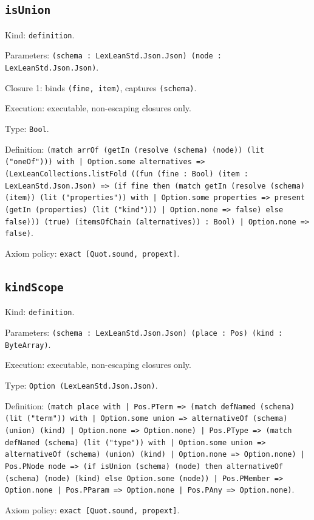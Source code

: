 \documentclass[11pt]{article}
\begin{document}
\subsection*{\texttt{isUnion}}
\noindent Kind: \texttt{definition}.\par
\noindent Parameters: \texttt{(schema : LexLeanStd.Json.Json) (node : LexLeanStd.Json.Json)}.\par
\noindent Closure 1: binds \texttt{(fine, item)}, captures \texttt{(schema)}.\par
\noindent Execution: executable, non-escaping closures only.\par
\noindent Type: \texttt{Bool}.\par
\noindent Definition: \texttt{(match arrOf (getIn (resolve (schema) (node)) (lit ("oneOf"))) with | Option.some alternatives => (LexLeanCollections.listFold ((fun (fine : Bool) (item : LexLeanStd.Json.Json) => (if fine then (match getIn (resolve (schema) (item)) (lit ("properties")) with | Option.some properties => present (getIn (properties) (lit ("kind"))) | Option.none => false) else false))) (true) (itemsOfChain (alternatives)) : Bool) | Option.none => false)}.\par
\noindent Axiom policy: \texttt{exact [Quot.sound, propext]}.\par
\subsection*{\texttt{kindScope}}
\noindent Kind: \texttt{definition}.\par
\noindent Parameters: \texttt{(schema : LexLeanStd.Json.Json) (place : Pos) (kind : ByteArray)}.\par
\noindent Execution: executable, non-escaping closures only.\par
\noindent Type: \texttt{Option (LexLeanStd.Json.Json)}.\par
\noindent Definition: \texttt{(match place with | Pos.PTerm => (match defNamed (schema) (lit ("term")) with | Option.some union => alternativeOf (schema) (union) (kind) | Option.none => Option.none) | Pos.PType => (match defNamed (schema) (lit ("type")) with | Option.some union => alternativeOf (schema) (union) (kind) | Option.none => Option.none) | Pos.PNode node => (if isUnion (schema) (node) then alternativeOf (schema) (node) (kind) else Option.some (node)) | Pos.PMember => Option.none | Pos.PParam => Option.none | Pos.PAny => Option.none)}.\par
\noindent Axiom policy: \texttt{exact [Quot.sound, propext]}.\par
\end{document}
